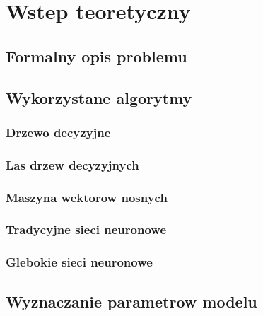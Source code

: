 \section{Wstep teoretyczny}
\subsection{Formalny opis problemu}
\subsection{Wykorzystane algorytmy}
\subsubsection{Drzewo decyzyjne}
\subsubsection{Las drzew decyzyjnych}
\subsubsection{Maszyna wektorow nosnych}
\subsubsection{Tradycyjne sieci neuronowe}
\subsubsection{Glebokie sieci neuronowe}

\subsection{Wyznaczanie parametrow modelu}

